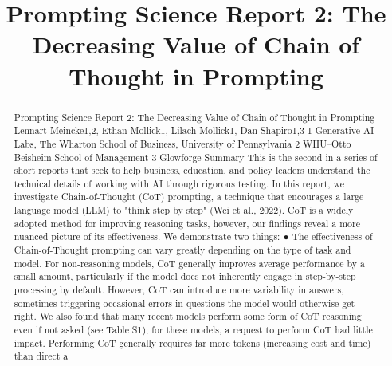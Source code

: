 \title{Prompting Science Report 2: The Decreasing Value of Chain of Thought in Prompting}

\maketitle

\begin{abstract}
Prompting Science Report 2: The Decreasing Value of Chain of Thought in Prompting Lennart Meincke1,2, Ethan Mollick1, Lilach Mollick1, Dan Shapiro1,3 1 Generative AI Labs, The Wharton School of Business, University of Pennsylvania​ 2 WHU–Otto Beisheim School of Management​ 3 Glowforge Summary This is the second in a series of short reports that seek to help business, education, and policy leaders understand the technical details of working with AI through rigorous testing. In this report, we investigate Chain-of-Thought (CoT) prompting, a technique that encourages a large language model (LLM) to "think step by step" (Wei et al., 2022). CoT is a widely adopted method for improving reasoning tasks, however, our findings reveal a more nuanced picture of its effectiveness. We demonstrate two things: ●​ The effectiveness of Chain-of-Thought prompting can vary greatly depending on the type of task and model. For non-reasoning models, CoT generally improves average performance by a small amount, particularly if the model does not inherently engage in step-by-step processing by default. However, CoT can introduce more variability in answers, sometimes triggering occasional errors in questions the model would otherwise get right. We also found that many recent models perform some form of CoT reasoning even if not asked (see Table S1); for these models, a request to perform CoT had little impact. Performing CoT generally requires far more tokens (increasing cost and time) than direct a
\end{abstract}

